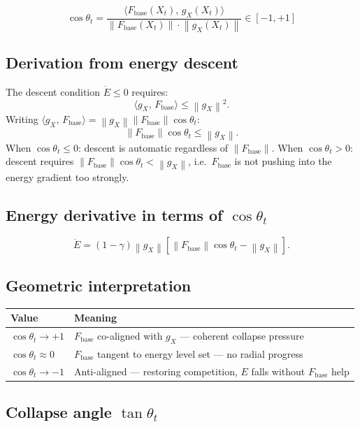 \documentclass[11pt,a4paper]{article}
\theoremstyle{definition}
\newcommand{\norm}[1]{\left\|#1\right\|}
\newcommand{\inner}[2]{\langle #1,\,#2\rangle}
\newcommand{\Fbase}{F_{\mathrm{base}}}
\newcommand{\gX}{g_X}
\begin{document}
\begin{lockedbox}
\[
\cos\theta_t = \frac{\inner{\Fbase(X_t)}{\gX(X_t)}}{\norm{\Fbase(X_t)}\cdot\norm{\gX(X_t)}} \in [-1,+1]
\]
\end{lockedbox}

\subsection{Derivation from energy descent}

The descent condition $\dot E \leq 0$ requires:
\[
\inner{\gX}{\Fbase} \leq \norm{\gX}^2.
\]
Writing $\inner{\gX}{\Fbase} = \norm{\gX}\norm{\Fbase}\cos\theta_t$:
\[
\norm{\Fbase}\cos\theta_t \leq \norm{\gX}.
\]
When $\cos\theta_t \leq 0$: descent is automatic regardless of $\norm{\Fbase}$.
When $\cos\theta_t > 0$: descent requires $\norm{\Fbase}\cos\theta_t < \norm{\gX}$,
i.e.\ $\Fbase$ is not pushing into the energy gradient too strongly.

\subsection{Energy derivative in terms of $\cos\theta_t$}

\[
\dot E = (1-\gamma)\norm{\gX}\left[\norm{\Fbase}\cos\theta_t - \norm{\gX}\right].
\]

\subsection{Geometric interpretation}

\begin{center}
\begin{tabular}{ll}
\toprule
Value & Meaning \\
\midrule
$\cos\theta_t \to +1$ & $\Fbase$ co-aligned with $\gX$ — coherent collapse pressure \\
$\cos\theta_t \approx 0$ & $\Fbase$ tangent to energy level set — no radial progress \\
$\cos\theta_t \to -1$ & Anti-aligned — restoring competition, $E$ falls without $\Fbase$ help \\
\bottomrule
\end{tabular}
\end{center}

\subsection{Collapse angle $\tan\theta_t$}
\end{document}
